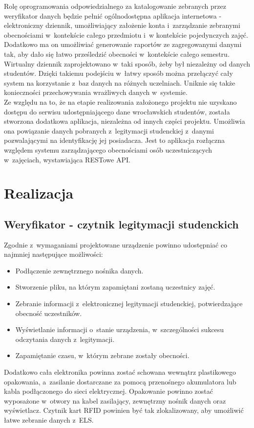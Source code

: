 \documentclass[declaration,shortabstract, mgr]{iithesis}
\begin{document}
\indent Rolę oprogramowania odpowiedzialnego za katalogowanie zebranych przez weryfikator danych będzie pełnić ogólnodostępna aplikacja internetowa - elektroniczny dziennik, umożliwiający założenie konta i~zarządzanie zebranymi obecnościami w~kontekście całego przedmiotu i~w kontekście pojedynczych zajęć. Dodatkowo ma on umożliwiać generowanie raportów ze zagregowanymi danymi tak, aby dało się łatwo prześledzić obecności w~kontekście całego semestru. \\
\indent Wirtualny dziennik zaprojektowano w~taki sposób, żeby był niezależny od danych studentów. Dzięki takiemu podejściu w~łatwy sposób można przełączyć cały system na korzystanie z~baz danych na różnych uczelniach. Uniknie się także konieczności przechowywania wrażliwych danych w~systemie. \\
\indent Ze względu na to, że na etapie realizowania założonego projektu nie uzyskano dostępu do serwisu udostępniającego dane wrocławskich studentów, została stworzona dodatkowa aplikacja, niezależna od innych części projektu. Umożliwia ona powiązanie danych pobranych z~legitymacji studenckiej z~danymi pozwalającymi na identyfikację jej posiadacza. Jest to aplikacja rozłączna względem systemu zarządzającego obecnościami osób uczestniczących w~zajęciach, wystawiająca RESTowe API.

\chapter{Realizacja}
\section{Weryfikator - czytnik legitymacji studenckich}
\indent Zgodnie z~wymaganiami projektowane urządzenie powinno udostępniać co najmniej następujące możliwości:
\begin{itemize}
\item Podłączenie zewnętrznego nośnika danych.
\item Stworzenie pliku, na którym zapamiętani zostaną uczestnicy zajęć.
\item Zebranie informacji z~elektronicznej legitymacji studenckiej, potwierdzające obecność uczestników.
\item Wyświetlanie informacji o~stanie urządzenia, w~szczególności sukcesu odczytania danych z~legitymacji.
\item Zapamiętanie czasu, w~którym zebrane zostały obecności.
\end{itemize}
\indent Dodatkowo cała elektronika powinna zostać schowana wewnątrz plastikowego opakowania, a~zasilanie dostarczane za pomocą przenośnego akumulatora lub kabla podłączonego do sieci elektrycznej. Opakowanie powinno zostać wyposażone w~otwory na kabel zasilający, zewnętrzny nośnik danych oraz wyświetlacz. Czytnik kart RFID powinien być tak zlokalizowany, aby umożliwić łatwe zebranie danych z~ELS.
\end{document}
